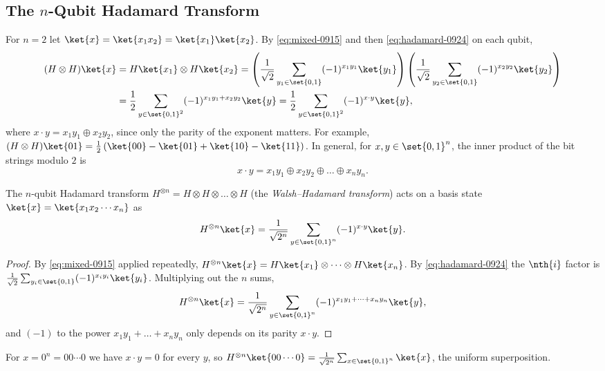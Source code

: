 \subsection{The \texorpdfstring{$n$}{n}-Qubit Hadamard Transform}

For $n = 2$ let $\ket{x} = \ket{x_1 x_2} = \ket{x_1}\ket{x_2}$. By \cref{eq:mixed-0915} and then
\cref{eq:hadamard-0924} on each qubit,
\begin{align*}
    (H \otimes H)\ket{x}
     & = H\ket{x_1} \otimes H\ket{x_2}
    = \left(\frac{1}{\sqrt{2}} \sum_{y_1 \in \set{0,1}} (-1)^{x_1 y_1} \ket{y_1}\right)
    \left(\frac{1}{\sqrt{2}} \sum_{y_2 \in \set{0,1}} (-1)^{x_2 y_2} \ket{y_2}\right) \\
     & = \frac{1}{2} \sum_{y \in \set{0,1}^2} (-1)^{x_1 y_1 + x_2 y_2} \ket{y}
    = \frac{1}{2} \sum_{y \in \set{0,1}^2} (-1)^{x \cdot y} \ket{y},
\end{align*}
where $x \cdot y = x_1 y_1 \oplus x_2 y_2$, since only the parity of the exponent matters. For
example, $(H \otimes H)\ket{01} = \frac{1}{2}\left(\ket{00} - \ket{01} + \ket{10} - \ket{11}\right)$.
In general, for $x, y \in \set{0,1}^n$, the inner product of the bit strings modulo $2$ is
\[x \cdot y = x_1 y_1 \oplus x_2 y_2 \oplus \dots \oplus x_n y_n.\]

\begin{lemma}\label{lem:wh-0924}
    The $n$-qubit Hadamard transform $H^{\otimes n} = H \otimes H \otimes \dots \otimes H$ (the
    \emph{Walsh--Hadamard transform}) acts on a basis state $\ket{x} = \ket{x_1 x_2 \cdots x_n}$ as
    \[H^{\otimes n} \ket{x} = \frac{1}{\sqrt{2^n}} \sum_{y \in \set{0,1}^n} (-1)^{x \cdot y} \ket{y}.\]
\end{lemma}

\begin{proof}
    By \cref{eq:mixed-0915} applied repeatedly,
    $H^{\otimes n} \ket{x} = H\ket{x_1} \otimes \dots \otimes H\ket{x_n}$.
    By \cref{eq:hadamard-0924} the $\nth{i}$ factor is
    $\frac{1}{\sqrt{2}} \sum_{y_i \in \set{0,1}} (-1)^{x_i y_i} \ket{y_i}$. Multiplying out the $n$ sums,
    \[H^{\otimes n} \ket{x}
        = \frac{1}{\sqrt{2^n}} \sum_{y \in \set{0,1}^n} (-1)^{x_1 y_1 + \dots + x_n y_n} \ket{y},\]
    and $(-1)$ to the power $x_1 y_1 + \dots + x_n y_n$ only depends on its parity $x \cdot y$.
\end{proof}

For $x = 0^n = 00 \cdots 0$ we have $x \cdot y = 0$ for every $y$, so
$H^{\otimes n} \ket{00 \cdots 0} = \frac{1}{\sqrt{2^n}} \sum_{x \in \set{0,1}^n} \ket{x}$,
the uniform superposition.

